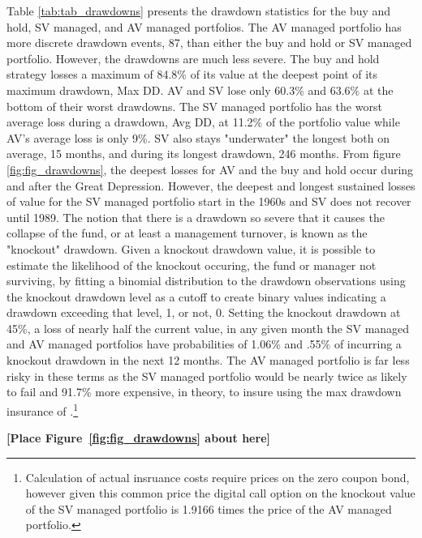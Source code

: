 Table \ref{tab:tab_drawdowns} presents the drawdown statistics for the buy and hold, SV managed, and AV managed portfolios. The AV managed portfolio has more discrete drawdown events, 87, than either the buy and hold or SV managed portfolio. However, the drawdowns are much less severe. The buy and hold strategy losses a maximum of 84.8\% of its value at the deepest point of its maximum drawdown, Max DD. AV and SV lose only 60.3\% and 63.6\% at the bottom of their worst drawdowns. The SV managed portfolio has the worst average loss during a drawdown, Avg DD, at 11.2\% of the portfolio value while AV's average loss is only 9\%. SV also stays "underwater" the longest both on average, 15 months, and during its longest drawdown, 246 months. From figure \ref{fig:fig_drawdowns}, the deepest losses for AV and the buy and hold occur during and after the Great Depression. However, the deepest and longest sustained losses of value for the SV managed portfolio start in the 1960s and SV does not recover until 1989. The notion that there is a drawdown so severe that it causes the collapse of the fund, or at least a management turnover, is known as the "knockout" drawdown. \citep{pav_notes_nodate} Given a knockout drawdown value, it is possible to estimate the likelihood of the knockout occuring, the fund or manager not surviving, by fitting a binomial distribution to the drawdown observations using the knockout drawdown level as a cutoff to create binary values indicating a drawdown exceeding that level, 1, or not, 0. \citep{pav_notes_nodate} Setting the knockout drawdown at 45\%, a loss of nearly half the current value, in any given month the SV managed and AV managed portfolios have probabilities of 1.06\% and .55\% of incurring a knockout drawdown in the next 12 months. The AV managed portfolio is far less risky in these terms as the SV managed portfolio would be nearly twice as likely to fail and 91.7\% more expensive, in theory, to insure using the max drawdown insurance of \citet{carr_maximum_2011}.\footnote{Calculation of actual insruance costs require prices on the zero coupon bond, however given this common price the digital call option on the knockout value of the SV managed portfolio is 1.9166 times the price of the AV managed portfolio.}

\bigskip
\centerline{\bf [Place Figure~\ref{fig:fig_drawdowns} about here]}
\bigskip